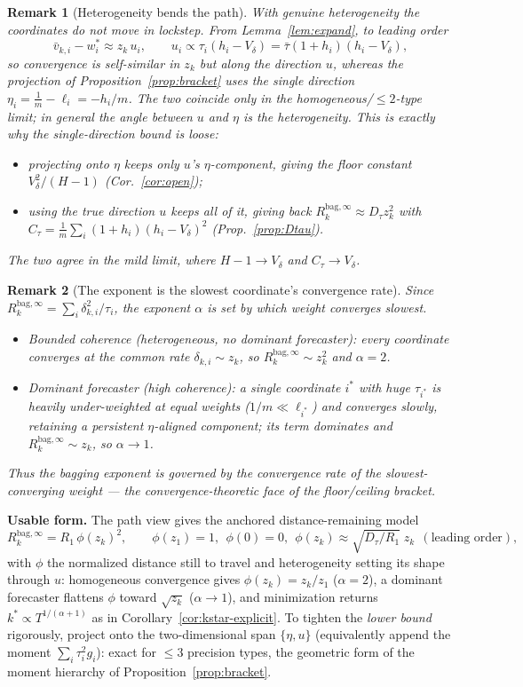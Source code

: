 \documentclass[11pt]{article}
\newcommand{\Rk}{R_k^{\mathrm{bag},\infty}}
\newtheorem{remark}{Remark}
\begin{document}
\begin{remark}[Heterogeneity bends the path]\label{rem:bend}
With genuine heterogeneity the coordinates do not move in lockstep. From
Lemma~\ref{lem:expand}, to leading order
\[
  \bar v_{k,i}-w^\ast_i\approx z_k\,u_i,\qquad u_i\propto \tau_i(h_i-V_\delta)
  =\bar\tau(1+h_i)(h_i-V_\delta),
\]
so convergence is self-similar in $z_k$ but along the direction $u$, whereas the
projection of Proposition~\ref{prop:bracket} uses the single direction
$\eta_i=\tfrac1m-\ell_i=-h_i/m$. The two coincide only in the homogeneous/$\le2$-type
limit; in general the \emph{angle between $u$ and $\eta$ is the heterogeneity}. This is
exactly why the single-direction bound is loose:
\begin{itemize}
\item projecting onto $\eta$ keeps only $u$'s $\eta$-component, giving the floor constant
  $V_\delta^2/(H-1)$ (Cor.~\ref{cor:open});
\item using the true direction $u$ keeps all of it, giving back $\Rk\approx D_\tau z_k^2$
  with $C_\tau=\frac1m\sum_i(1+h_i)(h_i-V_\delta)^2$ (Prop.~\ref{prop:Dtau}).
\end{itemize}
The two agree in the mild limit, where $H-1\to V_\delta$ and $C_\tau\to V_\delta$.
\end{remark}

\begin{remark}[The exponent is the slowest coordinate's convergence rate]\label{rem:slowest}
Since $\Rk=\sum_i\delta_{k,i}^2/\tau_i$, the exponent $\alpha$ is set by which weight
converges slowest.
\begin{itemize}
\item Bounded coherence (heterogeneous, no dominant forecaster): every coordinate
  converges at the common rate $\delta_{k,i}\sim z_k$, so $\Rk\sim z_k^2$ and $\alpha=2$.
\item Dominant forecaster (high coherence): a single coordinate $i^\ast$ with huge
  $\tau_{i^\ast}$ is heavily under-weighted at equal weights ($1/m\ll\ell_{i^\ast}$) and
  converges slowly, retaining a persistent $\eta$-aligned component; its term dominates
  and $\Rk\sim z_k$, so $\alpha\to1$.
\end{itemize}
Thus the bagging exponent is governed by the convergence rate of the slowest-converging
weight --- the convergence-theoretic face of the floor/ceiling bracket.
\end{remark}

\noindent\textbf{Usable form.} The path view gives the anchored distance-remaining model
\[
  \Rk=R_1\,\phi(z_k)^2,\qquad \phi(z_1)=1,\ \ \phi(0)=0,\ \
  \phi(z_k)\approx\sqrt{D_\tau/R_1}\;z_k\ \ (\text{leading order}),
\]
with $\phi$ the normalized distance still to travel and heterogeneity setting its shape
through $u$: homogeneous convergence gives $\phi(z_k)=z_k/z_1$ ($\alpha=2$), a dominant
forecaster flattens $\phi$ toward $\sqrt{z_k}$ ($\alpha\to1$), and minimization returns
$k^\ast\propto T^{1/(\alpha+1)}$ as in Corollary~\ref{cor:kstar-explicit}. To tighten the
\emph{lower bound} rigorously, project onto the two-dimensional span $\{\eta,u\}$
(equivalently append the moment $\sum_i\tau_i^2g_i$): exact for $\le3$ precision types, the
geometric form of the moment hierarchy of Proposition~\ref{prop:bracket}.
\end{document}
